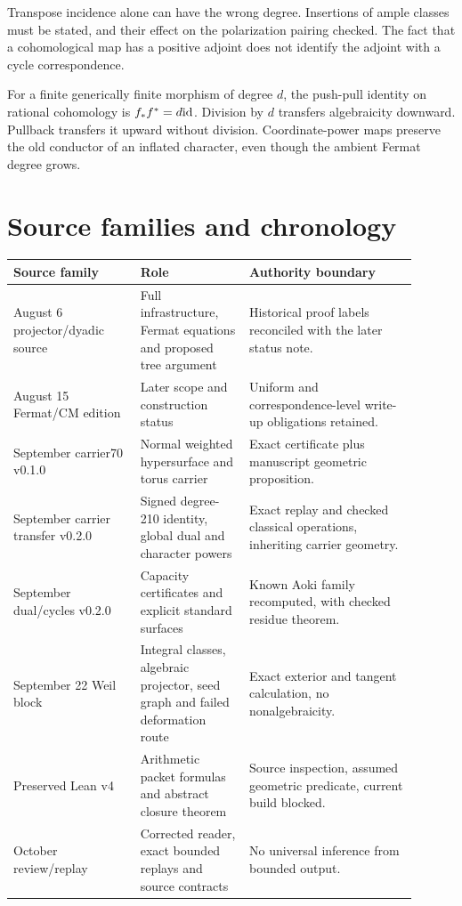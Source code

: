 Transpose incidence alone can have the wrong degree. Insertions of ample classes must be stated, and their effect on the polarization pairing checked. The fact that a cohomological map has a positive adjoint does not identify the adjoint with a cycle correspondence.

For a finite generically finite morphism of degree $d$, the push-pull identity on rational cohomology is $f_*f^*=d\mathrm{id}$. Division by $d$ transfers algebraicity downward. Pullback transfers it upward without division. Coordinate-power maps preserve the old conductor of an inflated character, even though the ambient Fermat degree grows.

\chapter{Source families and chronology}
\begin{longtable}{p{0.29\linewidth}p{0.24\linewidth}p{0.37\linewidth}}
\toprule
Source family & Role & Authority boundary\\
\midrule
August 6 projector/dyadic source & Full infrastructure, Fermat equations and proposed tree argument & Historical proof labels reconciled with the later status note.\\
August 15 Fermat/CM edition & Later scope and construction status & Uniform and correspondence-level write-up obligations retained.\\
September carrier70 v0.1.0 & Normal weighted hypersurface and torus carrier & Exact certificate plus manuscript geometric proposition.\\
September carrier transfer v0.2.0 & Signed degree-210 identity, global dual and character powers & Exact replay and checked classical operations, inheriting carrier geometry.\\
September dual/cycles v0.2.0 & Capacity certificates and explicit standard surfaces & Known Aoki family recomputed, with checked residue theorem.\\
September 22 Weil block & Integral classes, algebraic projector, seed graph and failed deformation route & Exact exterior and tangent calculation, no nonalgebraicity.\\
Preserved Lean v4 & Arithmetic packet formulas and abstract closure theorem & Source inspection, assumed geometric predicate, current build blocked.\\
October review/replay & Corrected reader, exact bounded replays and source contracts & No universal inference from bounded output.\\
\bottomrule
\end{longtable}

